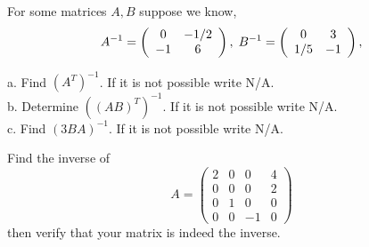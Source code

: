 \documentclass{ximera}
\begin{document}
\begin{exercise}
For some matrices $A, B$ suppose we know,
\[ A^{-1} = \left(\begin{array}{ccc}
 0 & -1/2 \\
-1 & 6\\
\end{array}\right), \hspace{.1cm} B^{-1} =
\left(\begin{array}{ccc}
0 & 3  \\
1/5 & -1 
\end{array}\right), \]

a. Find $\left(A^{T}\right)^{-1}$. If it is not possible write N/A. \\
b. Determine $\left((AB)^{T}\right)^{-1}$. If it is not possible write N/A.\\
c. Find $\left(3BA\right)^{-1}$. If it is not possible write N/A.
\pagebreak

\begin{exercise}
Find the inverse of
\[A = \left(\begin{array}{cccc}
2 & 0 & 0 & 4\\
0 & 0 &0& 2\\
0& 1 & 0 & 0\\
0 & 0 & -1 & 0
\end{array}\right)
\]
then verify that your matrix is indeed the inverse.


\end{exercise}
\end{exercise}
\end{document}
